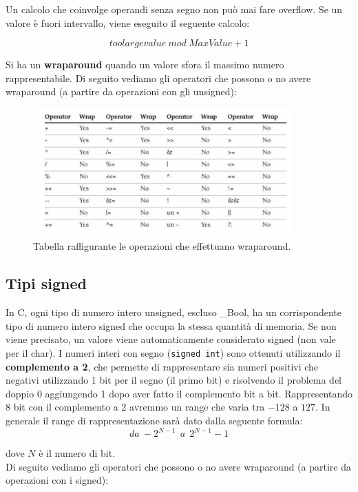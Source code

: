 Un calcolo che coinvolge operandi senza segno non può mai fare overflow.
Se un valore è fuori intervallo, viene eseguito il seguente calcolo:

\[
    toolargevalue \ mod \ MaxValue + 1
\]

Si ha un \textbf{wraparound} quando un valore sfora il massimo numero
rappresentabile. Di seguito vediamo gli operatori che possono o no avere
wraparound (a partire da operazioni con gli unsigned):

\begin{figure}[H]
    \centering
    \includegraphics[width=10cm, keepaspectratio]{capitoli/secure_coding/img/cap_2/wraparound.png}
    \caption{Tabella raffigurante le operazioni che effettuano wraparound.}
\end{figure}

\subsection{Tipi signed}

In C, ogni tipo di numero intero unsigned, escluso \_Bool, ha un corrispondente
tipo di numero intero signed che occupa la stessa quantità di memoria.
Se non viene precisato, un valore viene automaticamente considerato signed
(non vale per il char).
I numeri interi con segno (\verb|signed int|) sono ottenuti utilizzando il \textbf{complemento a 2},
che permette di rappresentare sia numeri positivi
che negativi utilizzando 1 bit per il segno (il primo bit) e risolvendo il problema del doppio 0 aggiungendo
1 dopo aver fatto il complemento bit a bit.
Rappresentando 8 bit con il complemento a 2 avremmo un range che varia tra $-128$ a $127$.
In generale il range di rappresentazione sarà dato dalla seguente formula:
\[
    da \ -2^{N - 1} \ \ a \ \ 2^{N - 1} - 1
\]

dove $N$ è il numero di bit.\\
Di seguito vediamo gli operatori che possono o no avere wraparound (a partire da
operazioni con i signed):

